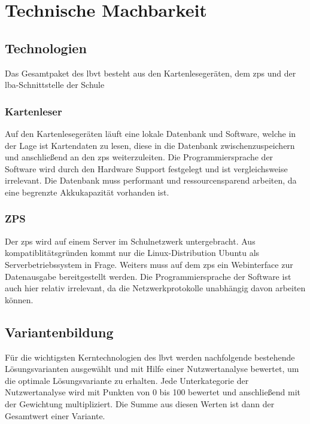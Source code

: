 \section{Technische Machbarkeit}
\subsection{Technologien}
Das Gesamtpaket des \gls{lbvt} besteht aus den Kartenlesegeräten, dem \gls{zps} und der \gls{lba}-Schnittstelle der Schule
\subsubsection{Kartenleser}
Auf den Kartenlesegeräten läuft eine lokale Datenbank und Software, welche in der Lage ist Kartendaten zu lesen, diese in die Datenbank zwischenzuspeichern und anschließend an den \gls{zps} weiterzuleiten. Die Programmiersprache der Software wird durch den Hardware Support festgelegt und ist vergleichsweise irrelevant. Die Datenbank muss performant und ressourcensparend arbeiten, da eine begrenzte Akkukapazität vorhanden ist.
\subsubsection{ZPS}
Der \gls{zps} wird auf einem Server im Schulnetzwerk untergebracht. Aus kompatiblitätsgründen kommt nur die Linux-Distribution Ubuntu als Serverbetriebssystem in Frage. Weiters muss auf dem \gls{zps} ein Webinterface zur Datenausgabe bereitgestellt werden. Die Programmiersprache der Software ist auch hier relativ irrelevant, da die Netzwerkprotokolle unabhängig davon arbeiten können.
\subsection{Variantenbildung}
Für die wichtigsten Kerntechnologien des \gls{lbvt} werden nachfolgende bestehende Lösungsvarianten ausgewählt und mit Hilfe einer Nutzwertanalyse bewertet, um die optimale Lösungsvariante zu erhalten. Jede Unterkategorie der Nutzwertanalyse wird mit Punkten von 0 bis 100 bewertet und anschließend mit der Gewichtung multipliziert. Die Summe aus diesen Werten ist dann der Gesamtwert einer Variante.
